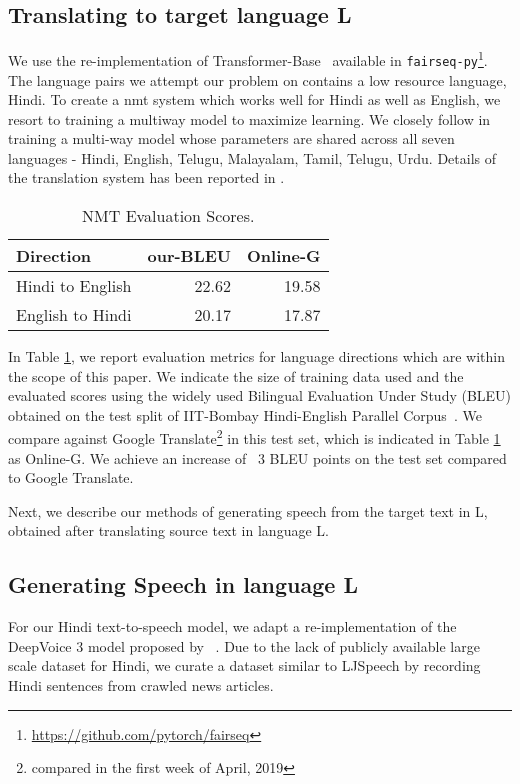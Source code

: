 \documentclass[sigconf]{acmart}
\begin{document}
\subsection{Translating to target language L}
We use the re-implementation of Transformer-Base~\cite{vaswani2017attention} available in \texttt{fairseq-py}\footnote{\url{https://github.com/pytorch/fairseq}}. The language pairs we attempt our problem on contains a low resource language, Hindi. To create a {\sc nmt} system which works well for Hindi as well as English, we resort to training a multiway model to maximize learning\cite{neubig2018rapid,aharoni2019massively}. We closely follow \citet{johnson2017google} in training a multi-way model whose parameters are shared across all seven languages - Hindi, English, Telugu, Malayalam, Tamil, Telugu, Urdu. Details of the translation system has been reported in \cite{philip2019baseline}.
\begin{table}[h]
    \centering
    \begin{tabular}{lrr}
    \toprule
        Direction  & our-BLEU  & Online-G \\ \midrule
        Hindi to English &  22.62 & 19.58  \\
        English to  Hindi &  20.17 &  17.87 \\
         \bottomrule
    \end{tabular}
    \caption{NMT Evaluation Scores.}
    \label{tab:translation_results}
    \vspace{-0.7cm}
\end{table}
In Table \ref{tab:translation_results}, we report evaluation metrics for language directions which are within the scope of this paper. We indicate the size of training data used and the evaluated scores using the widely used Bilingual Evaluation Under Study (BLEU) obtained on the test split of IIT-Bombay Hindi-English Parallel Corpus~\cite{kunchukuttan2018iit}. We compare against Google Translate\footnote{compared in the first week of April, 2019} in this test set, which is indicated in Table \ref{tab:translation_results} as Online-G. We achieve an increase of ~3 BLEU points on the test set compared to Google Translate.

Next, we describe our methods of generating speech from the target text in L, obtained after translating source text in language L.

\subsection{Generating Speech in language L}
For our Hindi text-to-speech model, we adapt a re-implementation of the DeepVoice 3 model proposed by ~\citet{ping2017deep}. Due to the lack of publicly available large scale dataset for Hindi, we curate a dataset similar to LJSpeech by recording Hindi sentences from crawled news articles.
\end{document}
